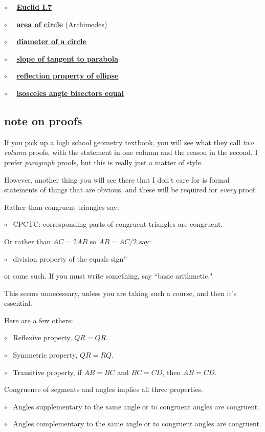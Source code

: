 \documentclass[11pt, oneside]{article}
\begin{document}
$\circ$ \ \ \hyperref[sec:Euclid_I_7]{\textbf{Euclid I.7}}

$\circ$ \ \ \hyperref[sec:circle_area_Archimedes]{\textbf{area of circle}} (Archimedes)

$\circ$ \ \ \hyperref[sec:diameter_of_a_circle]{\textbf{diameter of a circle}}

$\circ$ \ \ \hyperref[sec:slope_of_tangent]{\textbf{slope of tangent to parabola}}

$\circ$ \ \ \hyperref[sec:ellipse_proof_contradiction]{\textbf{reflection property of ellipse}}

$\circ$ \ \ \hyperref[sec:isosceles_bisector]{\textbf{isosceles angle bisectors equal}}

\subsection*{note on proofs}

If you pick up a high school geometry textbook, you will see what they call \emph{two column} proofs, with the statement in one column and the reason in the second.  I prefer \emph{paragraph} proofs, but this is really just a matter of style.  

However, another thing you will see there that I don't care for is formal statements of things that are obvious, and these will be required for \emph{every} proof.

Rather than congruent triangles say:

$\circ$ \ CPCTC: corresponding parts of congruent triangles are congruent.

Or rather than $AC = 2 AB$ so $AB = AC/2$ say:

$\circ$ \ division property of the equals sign"

or some such.  If you must write something, say ``basic arithmetic."

This seems unnecessary, unless you are taking such a course, and then it's essential.

Here are a few others:

$\circ$ \ Reflexive property, $QR = QR$.

$\circ$ \ Symmetric property, $QR = RQ$.

$\circ$ \ Transitive property, if $AB = BC$ and $BC = CD$, then $AB = CD$.

Congruence of segments and angles implies all three properties.

$\circ$ \ Angles supplementary to the same angle or to congruent angles are congruent.

$\circ$ \ Angles complementary to the same angle or to congruent angles are congruent.
\end{document}
